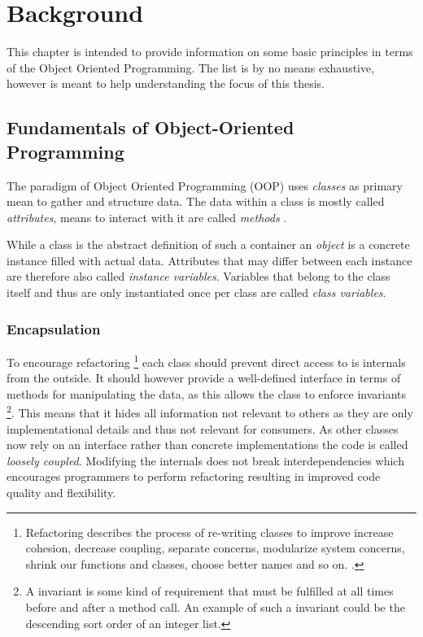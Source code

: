 \chapter{Background}

This chapter is intended to provide information on some basic principles in terms of the Object Oriented Programming. The list is by no means exhaustive, however is meant to help understanding the focus of this thesis.

\section{Fundamentals of Object-Oriented Programming}

The paradigm of Object Oriented Programming (OOP) uses \emph{classes} as primary mean to gather and structure data. The data within a class is mostly called \emph{attributes}, means to interact with it are called \emph{methods} \cite[p.80]{Castagna97} \cite[p.14]{gof}. 

While a class is the abstract definition of such a container an \emph{object} is a concrete instance filled with actual data. Attributes that may differ between each instance are therefore also called \emph{instance variables}. Variables that belong to the class itself and thus are only instantiated once per class are called \emph{class variables}. 

\subsection{Encapsulation} 
To encourage refactoring \footnote{Refactoring describes the process of re-writing classes to improve increase cohesion, decrease coupling, separate concerns, modularize system concerns, shrink our functions and classes, choose better names and so on. \cite[p. 172]{clean-code}.} each class should prevent direct access to is internals from the outside. It should however provide a well-defined interface in terms of methods for manipulating the data, as this allows the class to enforce invariants \footnote{A invariant is some kind of requirement that must be fulfilled at all times before and after a method call. An example of such a invariant could be the descending sort order of an integer list.}. This means that it hides all information not relevant to others as they are only implementational details and thus not relevant for consumers. As other classes now rely on an interface rather than concrete implementations the code is called \emph{loosely coupled}. Modifying the internals does not break interdependencies which encourages programmers to perform refactoring resulting in improved code quality and flexibility. 

